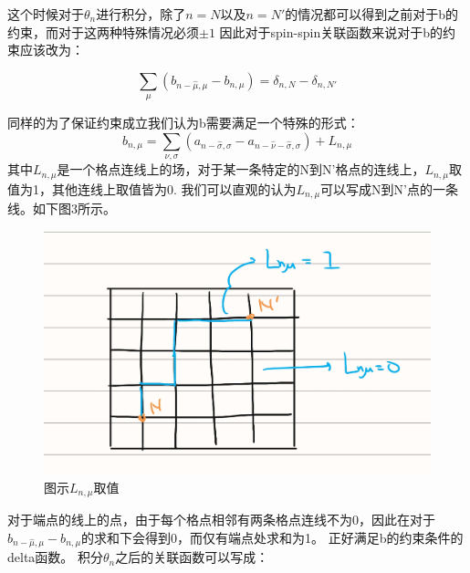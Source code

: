 \documentclass{article}
\begin{document}
这个时候对于$\theta_n$进行积分，除了$n = N$以及$n = N'$的情况都可以得到之前对于b的约束，而对于这两种特殊情况必须$\pm 1$
因此对于spin-spin关联函数来说对于b的约束应该改为：

\begin{equation}
    \sum_{\mu} \left( b_{n-\hat \mu,\mu} - b_{n,\mu}\right)= \delta_{n,N} - \delta_{n,N'}
\end{equation}

同样的为了保证约束成立我们认为b需要满足一个特殊的形式：
\begin{equation}
    b_{n,\mu} = \sum_{\nu,\sigma} (a_{n-\hat \sigma,\sigma} - a_{n-\hat\nu - \hat \sigma,\sigma})  + L_{n,\mu}
\end{equation}
其中$L_{n,\mu}$是一个格点连线上的场，对于某一条特定的N到N'格点的连线上，$L_{n,\mu}$取值为1，其他连线上取值皆为0.
我们可以直观的认为$L_{n,\mu}$可以写成N到N'点的一条线。如下图3所示。

\begin{figure}[h]
    \centering
    \includegraphics[scale=0.2]{3.jpg}
    \caption[short]{图示$L_{n,\mu}$取值}
    \label{figure}
\end{figure}
对于端点的线上的点，由于每个格点相邻有两条格点连线不为0，因此在对于$b_{n-\hat \mu,\mu}-b_{n,\mu}$的求和下会得到0，而仅有端点处求和为1。
正好满足b的约束条件的delta函数。
积分$\theta_n$之后的关联函数可以写成：
\end{document}
